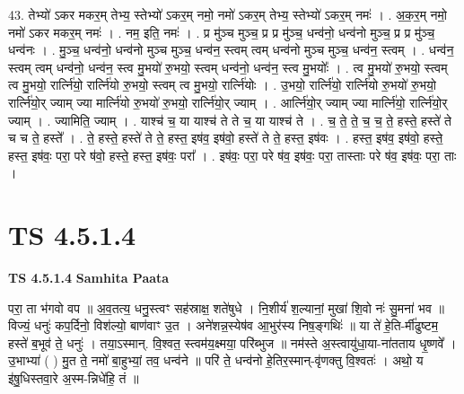 \documentclass[17pt]{extarticle}
\begin{document}
43. तेभ्यो॑ ऽकर मकर॒म् तेभ्य॒ स्तेभ्यो॑ ऽकर॒म् नमो॒ नमो॑ ऽकर॒म् तेभ्य॒ स्तेभ्यो॑ ऽकर॒म् नमः॑ । . अ॒क॒र॒म् नमो॒ नमो॑ ऽकर मकर॒म् नमः॑ । . नम॒ इति॒ नमः॑ । . प्र मु॑ञ्च मुञ्च॒ प्र प्र मु॑ञ्च॒ धन्व॑नो॒ धन्व॑नो मुञ्च॒ प्र प्र मु॑ञ्च॒ धन्व॑नः । . मु॒ञ्च॒ धन्व॑नो॒ धन्व॑नो मुञ्च मुञ्च॒ धन्व॑न॒ स्त्वम् त्वम् धन्व॑नो मुञ्च मुञ्च॒ धन्व॑न॒ स्त्वम् । . धन्व॑न॒ स्त्वम् त्वम् धन्व॑नो॒ धन्व॑न॒ स्त्व मु॒भयो॑ रु॒भयो॒ स्त्वम् धन्व॑नो॒ धन्व॑न॒ स्त्व मु॒भयोः᳚ । . त्व मु॒भयो॑ रु॒भयो॒ स्त्वम् त्व मु॒भयो॒ रार्त्नि॑यो॒ रार्त्नि॑यो रु॒भयो॒ स्त्वम् त्व मु॒भयो॒ रार्त्नि॑योः । . उ॒भयो॒ रार्त्नि॑यो॒ रार्त्नि॑यो रु॒भयो॑ रु॒भयो॒ रार्त्नि॑यो॒र् ज्याम् ज्या मार्त्नि॑यो रु॒भयो॑ रु॒भयो॒ रार्त्नि॑यो॒र् ज्याम् । . आर्त्नि॑यो॒र् ज्याम् ज्या मार्त्नि॑यो॒ रार्त्नि॑यो॒र् ज्याम् । . ज्यामिति॒ ज्याम् । . याश्च॑ च॒ या याश्च॑ ते ते च॒ या याश्च॑ ते । . च॒ ते॒ ते॒ च॒ च॒ ते॒ हस्ते॒ हस्ते॑ ते च च ते॒ हस्ते᳚ । . ते॒ हस्ते॒ हस्ते॑ ते ते॒ हस्त॒ इष॑व॒ इष॑वो॒ हस्ते॑ ते ते॒ हस्त॒ इष॑वः । . हस्त॒ इष॑व॒ इष॑वो॒ हस्ते॒ हस्त॒ इष॑वः॒ परा॒ परे ष॑वो॒ हस्ते॒ हस्त॒ इष॑वः॒ परा᳚ । . इष॑वः॒ परा॒ परे ष॑व॒ इष॑वः॒ परा॒ तास्ताः परे ष॑व॒ इष॑वः॒ परा॒ ताः । \newline
\pagebreak
{}

\section{ TS 4.5.1.4 }

\textbf{TS 4.5.1.4 } \newline
\textbf{Samhita Paata} \newline

परा॒ ता भ॑गवो वप ॥                                        अ॒व॒तत्य॒ धनु॒स्त्वꣳ सह॑स्राक्ष॒ शते॑षुधे । नि॒शीर्य॑ श॒ल्यानां॒ मुखा॑ शि॒वो नः॑ सु॒मना॑ भव ॥                          विज्यं॒ धनुः॑ कप॒र्दिनो॒ विश॑ल्यो॒ बाण॑वाꣳ उ॒त । अने॑शन्न॒स्येष॑व आ॒भुर॑स्य निष॒ङ्गथिः॑ ॥                                               या ते॑ हे॒ति-र्मी॑ढुष्टम॒ हस्ते॑ ब॒भूव॑ ते॒ धनुः॑ । तया॒ऽस्मान्. वि॒श्वत॒ स्त्वम॑य॒क्ष्मया॒ परि॑ब्भुज ॥                                  नम॑स्ते अ॒स्त्वायु॑धा॒या-ना॑तताय धृ॒ष्णवे᳚ । उ॒भाभ्या॑ ( ) मु॒त ते॒ नमो॑ बा॒हुभ्यां॒ तव॒ धन्व॑ने ॥                      परि॑ ते॒ धन्व॑नो हे॒तिर॒स्मान्-वृ॑णक्तु वि॒श्वतः॑ । अथो॒ य इ॑षु॒धिस्तवा॒रे अ॒स्म-न्निधे॑हि॒ तं ॥ \newline
\end{document}
